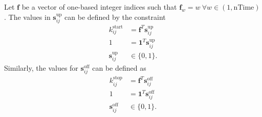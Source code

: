\par Let $\mathbf{f}$ be a vector of one-based integer indices such that $\mathbf{f}_w = w \ \forall w \in (1,\text{nTime})$. The values in $\mathbf{s}^{\text{up}}_{ij}$ can be defined by the constraint
\begin{equation}\label{eqn:idxStart}\begin{aligned}
	k^{\text{start}}_{ij} &= \mathbf{f}^T\mathbf{s}^{\text{up}}_{ij} \\
	1 &= \mathbf{1}^T\mathbf{s}^{\text{up}}_{ij} \\
	\mathbf{s}^{\text{up}}_{ij} &\in \{0,1\}.
\end{aligned} \end{equation}
Similarly, the values for $\mathbf{s}^{\text{off}}_{ij}$ can be defined as
\begin{equation} \label{eqn:idxEnd}\begin{aligned}
	k^{\text{stop}}_{ij} &= \mathbf{f}^T\mathbf{s}^{\text{off}}_{ij}\\ 
	1 &= \mathbf{1}^T\mathbf{s}^{\text{off}}_{ij} \\
	\mathbf{s}^{\text{off}}_{ij} &\in \{0,1\}.
\end{aligned} \end{equation}


